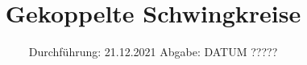 

\subject{V355}
\title{Gekoppelte Schwingkreise}
\date{%
  Durchführung: 21.12.2021
  \hspace{3em}
  Abgabe: DATUM ?????
}



\maketitle
\thispagestyle{empty}
\tableofcontents
\newpage






\printbibliography{}




